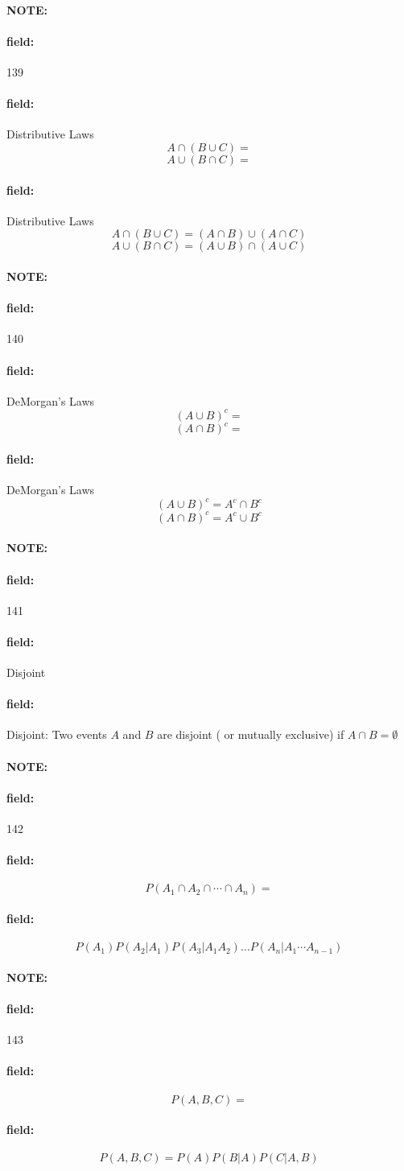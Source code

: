 \documentclass[12pt]{article}
\newenvironment{note}{\paragraph{NOTE:}}{}
\newenvironment{field}{\paragraph{field:}}{}
\begin{document}
\begin{note} \begin{field} \tiny 139 \end{field}
  \begin{field}
    Distributive Laws
    $$A \cap ( B \cup C) = $$
    $$ A \cup ( B \cap C) = $$
  \end{field}
    \begin{field}
      Distributive Laws
        $$A \cap ( B \cup C) = (A \cap B) \cup (A \cap C)$$
        $$ A \cup ( B \cap C) = (A \cup B) \cap ( A \cup C)$$
    \end{field}
\end{note}

\begin{note} \begin{field} \tiny 140 \end{field}
  \begin{field}
    DeMorgan's Laws
    $$(A \cup B)^c = $$
    $$(A \cap B)^c = $$
  \end{field}
    \begin{field}
      DeMorgan's Laws
        $$(A \cup B)^c = A^c \cap B^c$$
        $$(A \cap B)^c = A^c \cup B^c$$
    \end{field}
\end{note}

\begin{note} \begin{field} \tiny 141 \end{field}
  \begin{field}
    Disjoint
  \end{field}
    \begin{field}
        Disjoint: Two events $A$ and $B$ are disjoint ( or mutually exclusive) if $ A \cap B = \emptyset $
    \end{field}
\end{note}

\begin{note} \begin{field} \tiny 142 \end{field}
  \begin{field}
    $$P(A_1 \cap A_2 \cap \cdots \cap A_n)  = $$
  \end{field}
  \begin{field}
    $$P(A_1)P(A_2|A_1)P(A_3|A_1A_2) \ldots P(A_n|A_1\cdots A_{n-1}) $$
  \end{field}
\end{note}

\begin{note} \begin{field} \tiny 143 \end{field}
  \begin{field}
    $$ P(A,B,C) = $$
  \end{field}
  \begin{field}
    $$ P(A,B,C) = P(A)P(B|A)P(C|A,B)$$
  \end{field}
\end{note}
\end{document}
